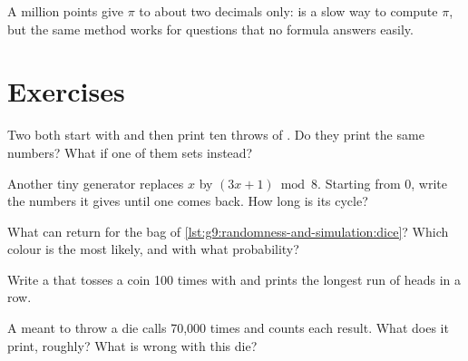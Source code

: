 \label{lst:g9:randomness-and-simulation:pi}

\label{out:g9:randomness-and-simulation:pi}

A million points give $\pi$ to about two decimals only:  is a slow way
to compute $\pi$, but the same method works for questions that no formula
answers easily.

\section{Exercises}

\begin{exercise}[$\star$]\label{exo:g9:randomness-and-simulation:1}
Two  both start with  and then print ten throws of
. Do they print the same numbers? What if one of them sets
 instead?
\end{exercise}

\begin{exercise}[$\star$]\label{exo:g9:randomness-and-simulation:2}
Another tiny generator replaces $x$ by $(3x + 1) \bmod 8$. Starting from 0, write
the numbers it gives until one comes back. How long is its cycle?
\end{exercise}

\begin{exercise}[$\star$]\label{exo:g9:randomness-and-simulation:3}
What can  return for the bag of
\cref{lst:g9:randomness-and-simulation:dice}? Which colour is the most likely,
and with what probability?
\end{exercise}

\begin{exercise}[$\star$]\label{exo:g9:randomness-and-simulation:4}
Write a  that tosses a coin 100 times with  and prints
the longest run of heads in a row.
\end{exercise}

\begin{exercise}[$\star\star$]\label{exo:g9:randomness-and-simulation:5}
A  meant to throw a die calls  70,000 times and
counts each result. What does it print, roughly? What is wrong with this die?

\label{lst:g9:randomness-and-simulation:die-bug}
\end{exercise}

